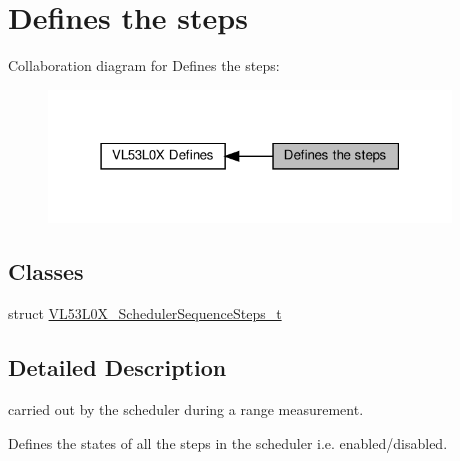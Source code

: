 \hypertarget{group__VL53L0X__define__SchedulerSequence__group}{}\section{Defines the steps}
\label{group__VL53L0X__define__SchedulerSequence__group}
Collaboration diagram for Defines the steps\+:\nopagebreak
\begin{figure}[H]
\begin{center}
\leavevmode
\includegraphics[width=303pt]{group__VL53L0X__define__SchedulerSequence__group}
\end{center}
\end{figure}
\subsection*{Classes}
\begin{DoxyCompactItemize}
\item 
struct \hyperlink{structVL53L0X__SchedulerSequenceSteps__t}{V\+L53\+L0\+X\+\_\+\+Scheduler\+Sequence\+Steps\+\_\+t}
\end{DoxyCompactItemize}


\subsection{Detailed Description}
carried out by the scheduler during a range measurement.

Defines the states of all the steps in the scheduler i.\+e. enabled/disabled. 